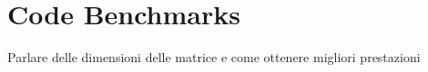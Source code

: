\documentclass[a4paper,twosides,openright,titlepage]{book}
\begin{document}
\tableofcontents 
\listoffigures 
\listoftables



\mainmatter

\chapter{Code Benchmarks}




\- Parlare delle dimensioni delle matrice e come ottenere migliori prestazioni \cite{tesi:brach}

\backmatter
{} 
\printbibliography
\end{document}
